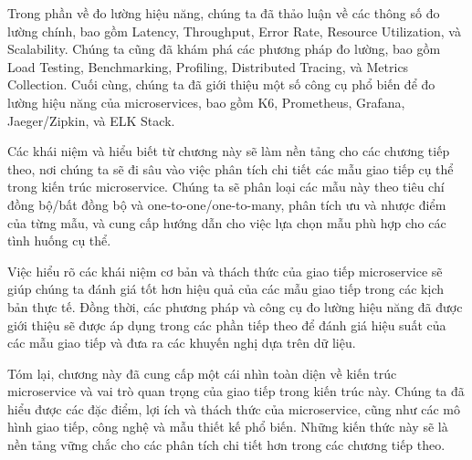 Trong phần về đo lường hiệu năng, chúng ta đã thảo luận về các thông số đo lường chính, bao gồm Latency, Throughput, Error Rate, Resource Utilization, và Scalability. Chúng ta cũng đã khám phá các phương pháp đo lường, bao gồm Load Testing, Benchmarking, Profiling, Distributed Tracing, và Metrics Collection. Cuối cùng, chúng ta đã giới thiệu một số công cụ phổ biến để đo lường hiệu năng của microservices, bao gồm K6, Prometheus, Grafana, Jaeger/Zipkin, và ELK Stack.

Các khái niệm và hiểu biết từ chương này sẽ làm nền tảng cho các chương tiếp theo, nơi chúng ta sẽ đi sâu vào việc phân tích chi tiết các mẫu giao tiếp cụ thể trong kiến trúc microservice. Chúng ta sẽ phân loại các mẫu này theo tiêu chí đồng bộ/bất đồng bộ và one-to-one/one-to-many, phân tích ưu và nhược điểm của từng mẫu, và cung cấp hướng dẫn cho việc lựa chọn mẫu phù hợp cho các tình huống cụ thể.

Việc hiểu rõ các khái niệm cơ bản và thách thức của giao tiếp microservice sẽ giúp chúng ta đánh giá tốt hơn hiệu quả của các mẫu giao tiếp trong các kịch bản thực tế. Đồng thời, các phương pháp và công cụ đo lường hiệu năng đã được giới thiệu sẽ được áp dụng trong các phần tiếp theo để đánh giá hiệu suất của các mẫu giao tiếp và đưa ra các khuyến nghị dựa trên dữ liệu.

Tóm lại, chương này đã cung cấp một cái nhìn toàn diện về kiến trúc microservice và vai trò quan trọng của giao tiếp trong kiến trúc này. Chúng ta đã hiểu được các đặc điểm, lợi ích và thách thức của microservice, cũng như các mô hình giao tiếp, công nghệ và mẫu thiết kế phổ biến. Những kiến thức này sẽ là nền tảng vững chắc cho các phân tích chi tiết hơn trong các chương tiếp theo. 